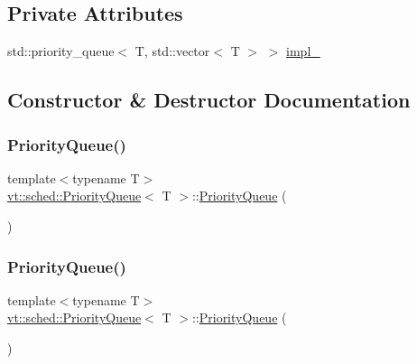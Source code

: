 \subsection*{Private Attributes}
\begin{DoxyCompactItemize}
\item 
std\+::priority\+\_\+queue$<$ T, std\+::vector$<$ T $>$ $>$ \hyperlink{structvt_1_1sched_1_1_priority_queue_a7b4a0abb373f4810e869bfc11303f487}{impl\+\_\+}
\end{DoxyCompactItemize}


\subsection{Constructor \& Destructor Documentation}
\mbox{\label{structvt_1_1sched_1_1_priority_queue_a03986418bd682344f22d1e0a5d4a3e3a}} 
\subsubsection{\texorpdfstring{Priority\+Queue()}{PriorityQueue()}\hspace{0.1cm}{\footnotesize\ttfamily [1/3]}}
{\footnotesize\ttfamily template$<$typename T$>$ \\
\hyperlink{structvt_1_1sched_1_1_priority_queue}{vt\+::sched\+::\+Priority\+Queue}$<$ T $>$\+::\hyperlink{structvt_1_1sched_1_1_priority_queue}{Priority\+Queue} (\begin{DoxyParamCaption}{ }\end{DoxyParamCaption})\hspace{0.3cm}{\ttfamily [default]}}

\mbox{\label{structvt_1_1sched_1_1_priority_queue_aca0fe178fbd601fa22816c2d895d5435}} 
\subsubsection{\texorpdfstring{Priority\+Queue()}{PriorityQueue()}\hspace{0.1cm}{\footnotesize\ttfamily [2/3]}}
{\footnotesize\ttfamily template$<$typename T$>$ \\
\hyperlink{structvt_1_1sched_1_1_priority_queue}{vt\+::sched\+::\+Priority\+Queue}$<$ T $>$\+::\hyperlink{structvt_1_1sched_1_1_priority_queue}{Priority\+Queue} (\begin{DoxyParamCaption}\item[{\hyperlink{structvt_1_1sched_1_1_priority_queue}{Priority\+Queue}$<$ T $>$ const \&}]{ }\end{DoxyParamCaption})\hspace{0.3cm}{\ttfamily [default]}}

